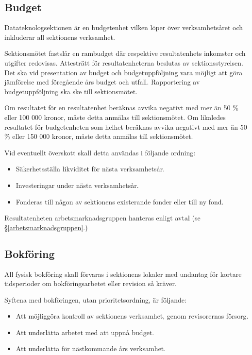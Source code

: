 \documentclass{datateknologsektionen-document}
\begin{document}
\subsection{Budget}
Datateknologsektionen är en budgetenhet vilken löper över verksamhetsåret och
inkluderar all sektionens verksamhet.

Sektionsmötet fastslår en rambudget där respektive resultatenhets inkomster och
utgifter redovisas. Attesträtt för resultatenheterna beslutas av sektionsstyrelsen.
Det ska vid presentation av budget och budgetuppföljning vara möjligt att göra
jämförelse med föregående års budget och utfall. Rapportering av budgetuppföljning
ska ske till sektionsmötet.

Om resultatet för en resultatenhet beräknas avvika negativt med mer än 50 \% eller
100 000 kronor, måste detta anmälas till sektionsmötet. Om likaledes resultatet för
budgetenheten som helhet beräknas avvika negativt med mer än 50 \% eller 150 000 kronor,
måste detta anmälas till sektionsmötet.

Vid eventuellt överskott skall detta användas i följande ordning:
\begin{itemize}
  \item Säkerhetsställa likviditet för nästa verksamhetsår.
  \item Investeringar under nästa verksamhetsår.
  \item Fonderas till någon av sektionens existerande fonder eller till ny fond.
\end{itemize}

Resultatenheten arbetsmarknadsgruppen hanteras enligt avtal (se \S \ref{arbetsmarknadsgruppen}.)

\subsection{Bokföring}
All fysisk bokföring skall förvaras i sektionens lokaler med undantag för kortare
tidsperioder om bokföringsarbetet eller revision så kräver.

Syftena med bokföringen, utan prioritetsordning, är följande:
\begin{itemize}
  \item Att möjliggöra kontroll av sektionens verksamhet, genom revisorernas försorg.
  \item Att underlätta arbetet med att uppnå budget.
  \item Att underlätta för nästkommande års verksamhet.
\end{itemize}
\end{document}
